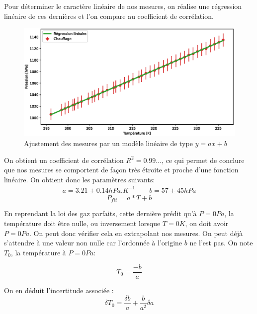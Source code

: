 \documentclass[12pt]{article}
\begin{document}
\newpage
Pour déterminer le caractère linéaire de nos mesures, on réalise une régression linéaire de ces dernières et l'on compare au coefficient de corrélation. 
\begin{figure}[!h]
	\begin{center}
		\includegraphics[scale=0.65]{img/exp2_graph2.eps}
		\caption{Ajustement des mesures par un modèle linéaire de type $y=ax+b$}
	\end{center}
	\label{Exp2_graph2}
\end{figure}

On obtient un coefficient de corrélation $R^2 = 0.99...$, ce qui permet de conclure que nos mesures se comportent de façon très étroite et proche d'une fonction linéaire. On obtient donc les paramètres suivants:
\begin{align*}
	a = 3.21 \pm 0.14 hPa.K^{-1} \quad \quad b = 57 \pm 45 hPa
\end{align*}
\begin{equation*}
	P_{fit} = a * T + b
\end{equation*}

En reprendant la loi des gaz parfaits, cette dernière prédit qu'à $P = 0Pa$, la température doit être nulle, ou inversement lorsque $T = 0K$, on doit avoir $P=0Pa$. On peut donc vérifier cela
en extrapolant nos mesures. On peut déjà s'attendre à une valeur non nulle car l'ordonnée à l'origine $b$ ne l'est pas. On note $T_0$, la température à $P=0Pa$:

\begin{equation}
	T_0 = \frac{-b}{a}
\end{equation}

On en déduit l'incertitude associée :
\begin{equation}
	\delta T_0 = \frac{\delta b}{a} + \frac{b}{a^2} \delta a
\end{equation}
\end{document}

